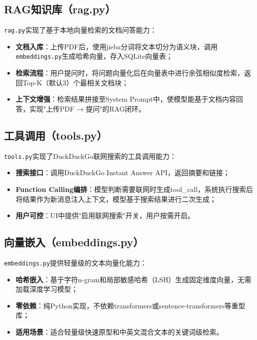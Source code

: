 \subsection{RAG知识库（rag.py）}

\texttt{rag.py}实现了基于本地向量检索的文档问答能力：

\begin{itemize}
  \item \textbf{文档入库}：上传PDF后，使用jieba分词将文本切分为语义块，调用\texttt{embeddings.py}生成哈希向量，存入SQLite向量表；
  \item \textbf{检索流程}：用户提问时，将问题向量化后在向量表中进行余弦相似度检索，返回Top-K（默认3）个最相关文档块；
  \item \textbf{上下文增强}：检索结果拼接至System Prompt中，使模型能基于文档内容回答，实现"上传PDF → 提问"的RAG闭环。
\end{itemize}

\subsection{工具调用（tools.py）}

\texttt{tools.py}实现了DuckDuckGo联网搜索的工具调用能力：

\begin{itemize}
  \item \textbf{搜索接口}：调用DuckDuckGo Instant Answer API，返回摘要和链接；
  \item \textbf{Function Calling编排}：模型判断需要联网时生成tool\_call，系统执行搜索后将结果作为新消息注入上下文，模型基于搜索结果进行二次生成；
  \item \textbf{用户可控}：UI中提供"启用联网搜索"开关，用户按需开启。
\end{itemize}

\subsection{向量嵌入（embeddings.py）}

\texttt{embeddings.py}提供轻量级的文本向量化能力：

\begin{itemize}
  \item \textbf{哈希嵌入}：基于字符n-gram和局部敏感哈希（LSH）生成固定维度向量，无需加载深度学习模型；
  \item \textbf{零依赖}：纯Python实现，不依赖transformers或sentence-transformers等重型库；
  \item \textbf{适用场景}：适合轻量级快速原型和中英文混合文本的关键词级检索。
\end{itemize}

